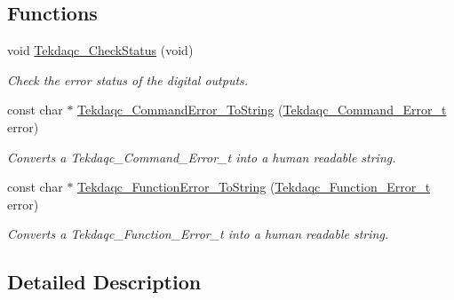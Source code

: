 \subsection*{Functions}
\begin{DoxyCompactItemize}
\item 
void \hyperlink{group__tekdaqc__error_ga5da23e6c262bd5e28f3b73a588470493}{Tekdaqc\-\_\-\-Check\-Status} (void)
\begin{DoxyCompactList}\small\item\em Check the error status of the digital outputs. \end{DoxyCompactList}\item 
const char $\ast$ \hyperlink{group__tekdaqc__error_ga9e4249e557d2ff186f09a6f941bfcaa2}{Tekdaqc\-\_\-\-Command\-Error\-\_\-\-To\-String} (\hyperlink{group__tekdaqc__error_ga91c51567356a5f53b2d62610fa1bf397}{Tekdaqc\-\_\-\-Command\-\_\-\-Error\-\_\-t} error)
\begin{DoxyCompactList}\small\item\em Converts a Tekdaqc\-\_\-\-Command\-\_\-\-Error\-\_\-t into a human readable string. \end{DoxyCompactList}\item 
const char $\ast$ \hyperlink{group__tekdaqc__error_ga82d499e0314eb5c3bdab515f82be322c}{Tekdaqc\-\_\-\-Function\-Error\-\_\-\-To\-String} (\hyperlink{group__tekdaqc__error_ga19df05d919ecca7a7501b35ae9080a32}{Tekdaqc\-\_\-\-Function\-\_\-\-Error\-\_\-t} error)
\begin{DoxyCompactList}\small\item\em Converts a Tekdaqc\-\_\-\-Function\-\_\-\-Error\-\_\-t into a human readable string. \end{DoxyCompactList}\end{DoxyCompactItemize}


\subsection{Detailed Description}


